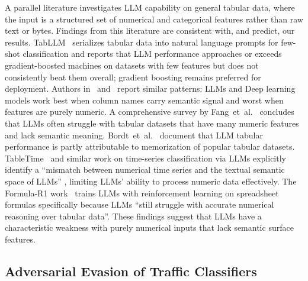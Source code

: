 \documentclass[conference]{IEEEtran}
\begin{document}
A parallel literature investigates LLM capability on general tabular data, where the input is a structured set of numerical and categorical features rather than raw text or bytes. Findings from this literature are consistent with, and predict, our results. TabLLM~\cite{hegselmann2023tabllm} serializes tabular data into natural language prompts for few-shot classification and reports that LLM performance approaches or exceeds gradient-boosted machines on datasets with few features but does not consistently beat them overall; gradient boosting remains preferred for deployment. Authors in~\cite{dinh2022lift} and~\cite{borisov2022deep, borisov2022language} report similar patterns: LLMs and Deep learning models work best when column names carry semantic signal and worst when features are purely numeric. A comprehensive survey by Fang~et~al.~\cite{fang2024large} concludes that LLMs often struggle with tabular datasets that have many numeric features and lack semantic meaning. Bordt~et~al.~\cite{bordt2024elephants} document that LLM tabular performance is partly attributable to memorization of popular tabular datasets. TableTime~\cite{wang2024tabletime} and similar work on time-series classification via LLMs explicitly identify a ``mismatch between numerical time series and the textual semantic space of LLMs'' \cite{wang2024tabletime}, limiting LLMs' ability to process numeric data effectively. The Formula-R1 work~\cite{formular12025} trains LLMs with reinforcement learning on spreadsheet formulas specifically because LLMs ``still struggle with accurate numerical reasoning over tabular data''\cite{formular12025}. These findings suggest that LLMs have a characteristic weakness with purely numerical inputs that lack semantic surface features.

\subsection{Adversarial Evasion of Traffic Classifiers}
\end{document}
